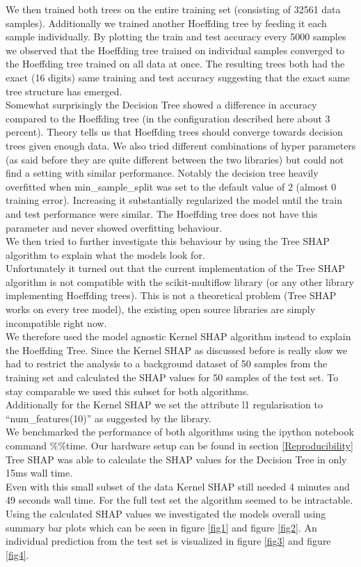 \documentclass[conference]{IEEEtran}
\begin{document}
We then trained both trees on the entire training set (consisting of 32561 data samples).
Additionally we trained another Hoeffding tree by feeding it each sample individually.
By plotting the train and test accuracy every 5000 samples we observed that the Hoeffding tree trained on individual samples converged to the Hoeffding tree trained on all data at once. 
The resulting trees both had the exact (16 digits) same training and test accuracy suggesting that the exact same tree structure has emerged.\\
Somewhat surprisingly the Decision Tree showed a difference in accuracy compared to the Hoeffding tree (in the configuration described here about 3 percent). 
Theory tells us that Hoeffding trees should converge towards decision trees given enough data.
We also tried different combinations of hyper parameters (as said before they are quite different between the two libraries) but could not find a setting with similar performance.
Notably the decision tree heavily overfitted when min\_sample\_split was set to the default value of 2 (almost 0 training error). Increasing it substantially regularized the model until the train and test performance were similar. 
The Hoeffding tree does not have this parameter and never showed overfitting behaviour.\\
We then tried to further investigate this behaviour by using the Tree SHAP algorithm to explain what the models look for.\\
Unfortunately it turned out that the current implementation of the Tree SHAP algorithm \cite{b16} is not compatible with the scikit-multiflow library (or any other library implementing Hoeffding trees).
This is not a theoretical problem (Tree SHAP works on every tree model), the existing open source libraries are simply incompatible right now.\\
We therefore used the model agnostic Kernel SHAP algorithm instead to explain the Hoeffding Tree.
Since the Kernel SHAP as discussed before is really slow we had to restrict the analysis to a background dataset of 50 samples from the training set and calculated the SHAP values for 50 samples of the test set. To stay comparable we used this subset for both algorithms.\\
Additionally for the Kernel SHAP we set the attribute l1 regularisation to ``num\_features(10)'' as suggested by the library.\\
We benchmarked the performance of both algorithms using the ipython notebook command \%\%time. Our hardware setup can be found in section \ref{Reproducibility}\\
Tree SHAP was able to calculate the SHAP values for the Decision Tree in only 15ms wall time.\\
Even with this small subset of the data Kernel SHAP still needed 4 minutes and 49 seconds wall time.
For the full test set the algorithm seemed to be intractable.\\
Using the calculated SHAP values we investigated the models overall using summary bar plots which can be seen in figure \ref{fig1} and figure \ref{fig2}. An individual prediction from the test set is visualized in figure \ref{fig3} and figure \ref{fig4}.\\
\end{document}
